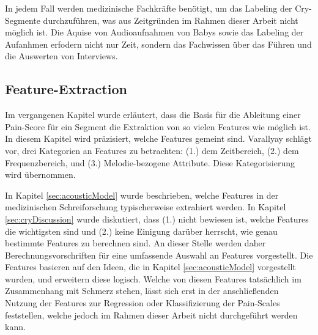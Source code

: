 In jedem Fall werden medizinische Fachkräfte benötigt, um das Labeling der Cry-Segmente durchzuführen, was aus Zeitgründen im Rahmen dieser Arbeit nicht möglich ist. Die Aquise von Audioaufnahmen von Babys sowie das Labeling der Aufanhmen erfodern nicht nur Zeit, sondern das Fachwissen über das Führen und die Auswerten von Interviews.

\subsection{Feature-Extraction}
\label{sec:segmentFeatures}

Im vergangenen Kapitel wurde erläutert, dass die Basis für die Ableitung einer Pain-Score für ein Segment die Extraktion von \glqq so vielen Features wie möglich\grqq{} ist. In diesem Kapitel wird präzisiert, welche Features gemeint sind.  Varallyay \cite[S. 16 - 17]{cry_thesis} schlägt vor, drei Kategorien an Features zu betrachten: (1.) dem Zeitbereich, (2.) dem Frequenzbereich, und (3.) Melodie-bezogene Attribute. Diese Kategorisierung wird übernommen.

In Kapitel \ref{sec:acousticModel} wurde beschrieben, welche Features in der medizinischen Schreiforschung typischerweise extrahiert werden. In Kapitel \ref{sec:cryDiscussion} wurde diskutiert, dass (1.) nicht bewiesen ist, welche Features die \glqq wichtigsten\grqq{} sind und (2.) keine Einigung darüber herrscht, wie genau bestimmte Features zu berechnen sind. An dieser Stelle werden daher Berechnungsvorschriften für eine umfassende Auswahl an Features vorgestellt. Die Features basieren auf den Ideen, die in Kapitel \ref{sec:acousticModel} vorgestellt wurden, und erweitern diese logisch. Welche von diesen Features tatsächlich im Zusammenhang mit Schmerz stehen, lässt sich erst in der anschließenden Nutzung der Features zur Regression oder Klassifizierung der Pain-Scales feststellen, welche jedoch im Rahmen dieser Arbeit nicht durchgeführt werden kann.

